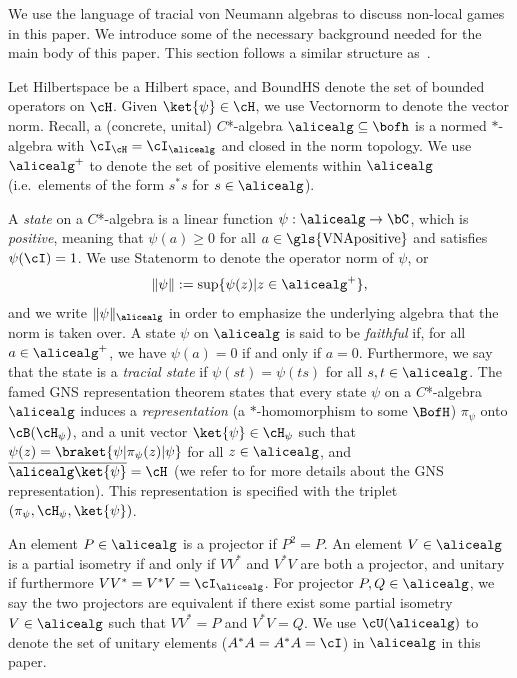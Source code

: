 We use the language of tracial von Neumann algebras to discuss non-local games in this paper. We introduce some of the necessary background needed for the main body of this paper. This section follows a similar structure as~\cite[Section 2.3]{linTracialEmbeddableStrategies2024}. 


Let \gls{Hilbertspace} be a Hilbert space, and \gls{BoundHS} denote the set of bounded operators on $\cH$. Given $\ket{\psi} \in \cH$, we use \gls{Vectornorm} to denote the vector norm. Recall, a (concrete, unital) $C$*-algebra $\alicealg \subseteq \bofh$ is a normed $*$-algebra with $\cI_{\cH} = \cI_{\alicealg}$ and closed in the norm topology. We use $\alicealg^{+}$ to denote the set of positive elements within $\alicealg$ (i.e.~elements of the form $s^*s$ for $s \in \alicealg$).

A \textit{state} on a $C$*-algebra is a linear function $\psi: \alicealg \rightarrow \bC$, which is \textit{positive}, meaning that $\psi(a) \geq 0$ for all $a \in \text{\gls{VNApositive}}$ and satisfies $\psi(\cI) = 1$. We use \gls{Statenorm} to denote the operator norm of $\psi$, or 
\begin{equation*}
	\| \psi \| := \sup\{ \psi(z) | z \in \alicealg^{+}\},
\end{equation*}
and we write $\| \psi\|_{\alicealg}$ in order to emphasize the underlying algebra that the norm is taken over. A state $\psi$ on $\alicealg$ is said to be \textit{faithful} if, for all $a \in \alicealg^{+}$, we have $\psi(a) = 0$ if and only if $a = 0$. Furthermore, we say that the  state is a \textit{tracial state} if $\psi(st) = \psi(ts)$ for all $s,t \in \alicealg$. The famed GNS representation theorem states that every state $\psi$ on a $C$*-algebra $\alicealg$ induces a \textit{representation} (a $*$-homomorphism to some $\BofH$) $\pi_{\psi}$ onto $\cB(\cH_{\psi})$, and a unit vector $\ket{\psi} \in \cH_{\psi}$ such that $\psi(z) = \braket{\psi|\pi_{\psi}(z)|\psi}$ for all $z \in \alicealg$, and $\overline{\alicealg \ket{\psi}} = \cH$ (we refer to \cite[Theorem 4.5.2]{kadisonFundamentalsTheoryOperator1997} for more details about the GNS representation). This representation is specified with the triplet $(\pi_{\psi}, \cH_{\psi}, \ket{\psi})$.

An element $P \in \alicealg$ is a projector if $P^2 = P$. An element $V \in \alicealg$ is a partial isometry if and only if $VV^*$ and $V^*V$ are both a projector, and unitary if furthermore $VV^* = V^*V = \cI_{\alicealg}$. For projector $P, Q \in \alicealg$, we say the two projectors are equivalent if there exist some partial isometry $V \in \alicealg$ such that $VV^* = P$ and $V^*V = Q$. We use $\cU(\alicealg)$ to denote the set of unitary elements ($A^* A = A^* A= \cI$) in $\alicealg$ in this paper. 

